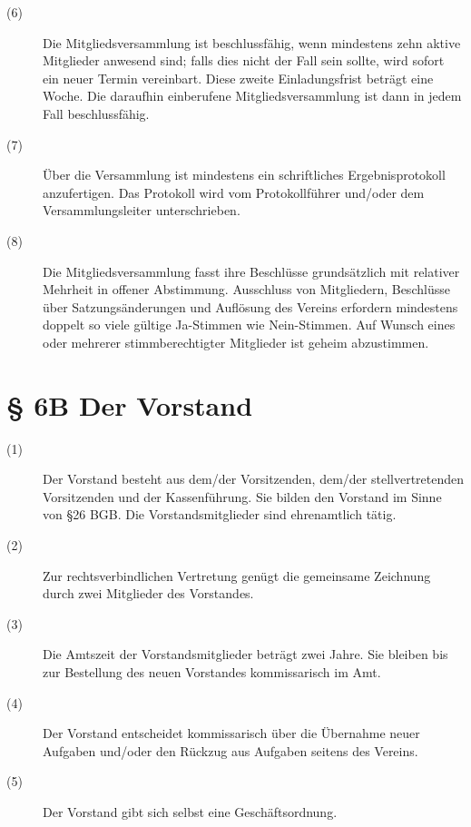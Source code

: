 \documentclass[a4paper,12pt]{scrartcl}
\begin{document}
\begin{description}
\item[(6)] Die Mitgliedsversammlung ist beschlussfähig, wenn mindestens zehn aktive Mitglieder anwesend sind; falls dies nicht der Fall sein sollte, wird sofort ein neuer Termin vereinbart. Diese zweite Einladungsfrist beträgt eine Woche. Die daraufhin einberufene Mitgliedsversammlung ist dann in jedem Fall beschlussfähig.
\item[(7)] Über die Versammlung ist mindestens ein schriftliches Ergebnisprotokoll anzufertigen. Das Protokoll wird vom Protokollführer und/oder dem Versammlungsleiter unterschrieben.
\item[(8)] Die Mitgliedsversammlung fasst ihre Beschlüsse grundsätzlich mit relativer Mehrheit in offener Abstimmung. Ausschluss von Mitgliedern, Beschlüsse über Satzungsänderungen und Auflösung des Vereins erfordern mindestens doppelt so viele gültige Ja-Stimmen wie Nein-Stimmen. Auf Wunsch eines oder mehrerer stimmberechtigter Mitglieder ist geheim abzustimmen.

\end{description}



\section*{\S{} 6B Der Vorstand}
\begin{description} 

\item[(1)] Der Vorstand besteht aus dem/der Vorsitzenden, dem/der stellvertretenden Vorsitzenden und der Kassenführung. Sie bilden den Vorstand im Sinne von §26 BGB. Die Vorstandsmitglieder sind ehrenamtlich tätig.
\item[(2)] Zur rechtsverbindlichen Vertretung genügt die gemeinsame Zeichnung durch zwei Mitglieder des Vorstandes.
\item[(3)] Die Amtszeit der Vorstandsmitglieder beträgt zwei Jahre. Sie bleiben bis zur Bestellung des neuen Vorstandes kommissarisch im Amt.
\item[(4)] Der Vorstand entscheidet kommissarisch über die Übernahme neuer Aufgaben und/oder den Rückzug aus Aufgaben seitens des Vereins. %
\item[(5)] Der Vorstand gibt sich selbst eine Geschäftsordnung.

\end{description}
\end{document}
